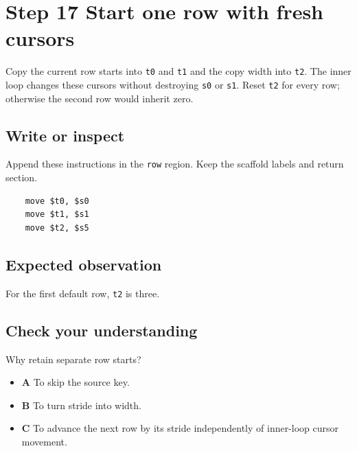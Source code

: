 \section{Step 17 Start one row with fresh cursors}\label{blit-s17}

Copy the current row starts into \texttt{t0} and \texttt{t1} and the copy width into \texttt{t2}. The inner loop changes these cursors without destroying \texttt{s0} or \texttt{s1}. Reset \texttt{t2} for every row; otherwise the second row would inherit zero.

\subsection{Write or inspect}
Append these instructions in the \texttt{row} region. Keep the scaffold labels and return section.

\begin{verbatim}
    move $t0, $s0
    move $t1, $s1
    move $t2, $s5
\end{verbatim}

\subsection{Expected observation}
For the first default row, \texttt{t2} is three.

\subsection{Check your understanding}
Why retain separate row starts?

\begin{itemize}
  \item \textbf{A} To skip the source key.
  \item \textbf{B} To turn stride into width.
  \item \textbf{C} To advance the next row by its stride independently of inner-loop cursor movement.
\end{itemize}
